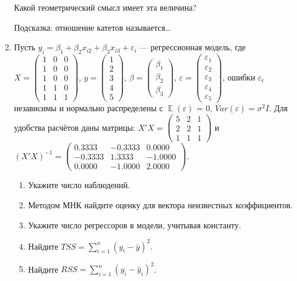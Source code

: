 \documentclass[12pt, a4paper]{article}
\DeclareMathOperator{\E}{\mathbb{E}}
\def \hy{\hat{y}}
\def \e{\varepsilon}
\begin{document}
\begin{enumerate}
Какой геометрический смысл имеет эта величина?

Подсказка: отношение катетов называется\ldots

\item
Пусть $y_i = \beta_1 + \beta_2 x_{i2} + \beta_3 x_{i3} + \e_i$ — регрессионная модель, где $X = \begin{pmatrix} 1 & 0 & 0 \\ 1 & 0 & 0 \\ 1 & 0 & 0 \\ 1 & 1 & 0 \\ 1 & 1 & 1 \end{pmatrix}$, $y = \begin{pmatrix} 1 \\ 2 \\ 3 \\ 4 \\ 5 \end{pmatrix}$, $\beta = \begin{pmatrix} \beta_1 \\ \beta_2 \\ \beta_3 \end{pmatrix}$, $\e = \begin{pmatrix} \e_1 \\ \e_2 \\ \e_3 \\ \e_4 \\ \e_5  \end{pmatrix}$, ошибки $\e_i$ независимы и нормально распределены с $\E(\e)$ = 0, $Var(\e) = \sigma^2 I$. Для удобства расчётов даны матрицы: $X'X = \begin{pmatrix} 5 & 2 & 1 \\ 2 & 2 & 1\\ 1 & 1 & 1 \end{pmatrix}$ и $(X'X)^{-1}= \begin{pmatrix} 0.3333 & -0.3333 & 0.0000 \\ -0.3333 & 1.3333 & -1.0000 \\ 0.0000 & -1.0000 & 2.0000 \end{pmatrix}$.



\begin{enumerate}
\item Укажите число наблюдений.
\item Методом МНК найдите оценку для вектора неизвестных коэффициентов.

\item Укажите число регрессоров в модели, учитывая константу.
\item Найдите $TSS = \sum_{i=1}^n (y_i - \bar y)^2$.
\item Найдите $RSS = \sum_{i=1}^n (y_i - \hy_i)^2$.
\end{enumerate}


\end{enumerate}
\end{document}
